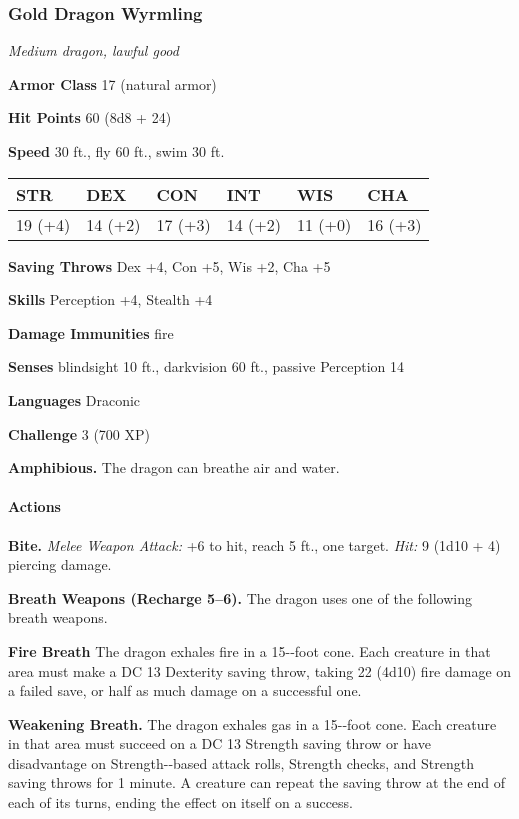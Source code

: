 \documentclass[
]{article}
\begin{document}
\hypertarget{gold-dragon-wyrmling}{%
\subsubsection{Gold Dragon Wyrmling}\label{gold-dragon-wyrmling}}

\emph{Medium dragon, lawful good}

\textbf{Armor Class} 17 (natural armor)

\textbf{Hit Points} 60 (8d8 + 24)

\textbf{Speed} 30 ft., fly 60 ft., swim 30 ft.

\begin{longtable}[]{@{}llllll@{}}
\toprule
STR & DEX & CON & INT & WIS & CHA\tabularnewline
\midrule
\endhead
19 (+4) & 14 (+2) & 17 (+3) & 14 (+2) & 11 (+0) & 16 (+3)\tabularnewline
\bottomrule
\end{longtable}

\textbf{Saving Throws} Dex +4, Con +5, Wis +2, Cha +5

\textbf{Skills} Perception +4, Stealth +4

\textbf{Damage Immunities} fire

\textbf{Senses} blindsight 10 ft., darkvision 60 ft., passive Perception
14

\textbf{Languages} Draconic

\textbf{Challenge} 3 (700 XP)

\textbf{Amphibious.} The dragon can breathe air and water.

\hypertarget{actions-58}{%
\paragraph{Actions}\label{actions-58}}

\textbf{Bite.} \emph{Melee Weapon Attack:} +6 to hit, reach 5 ft., one
target. \emph{Hit:} 9 (1d10 + 4) piercing damage.

\textbf{Breath Weapons (Recharge 5--6).} The dragon uses one of the
following breath weapons.

\textbf{Fire Breath} The dragon exhales fire in a 15-­‐foot cone. Each
creature in that area must make a DC 13 Dexterity saving throw, taking
22 (4d10) fire damage on a failed save, or half as much damage on a
successful one.

\textbf{Weakening Breath.} The dragon exhales gas in a 15-­‐foot cone.
Each creature in that area must succeed on a DC 13 Strength saving throw
or have disadvantage on Strength-­‐based attack rolls, Strength checks,
and Strength saving throws for 1 minute. A creature can repeat the
saving throw at the end of each of its turns, ending the effect on
itself on a success.
\end{document}
